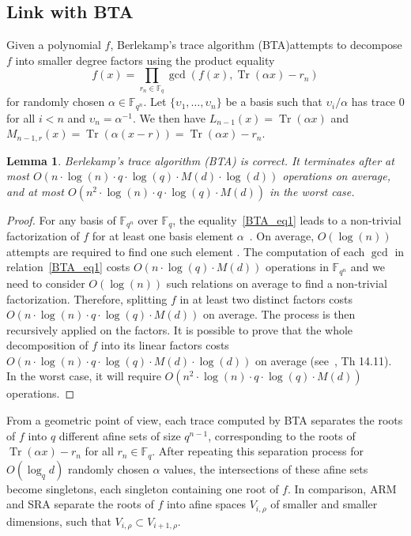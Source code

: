 \documentclass{sig-alternate}
\newcommand{\ff}[1]{\mathbb{F}_{#1}}
\newcommand{\fq}{\ff{q}}
\newcommand{\fqn}{\ff{q^n}}
\newcommand{\dd}{d}
\newcommand{\qq}{q}
\newcommand{\nn}{n}
\newcommand{\qn}{{\qq^\nn}}
\newcommand{\basef}{\ff{\qq}}
\newcommand{\extf}{\ff{\qn}}
\DeclareMathOperator{\Tr}{Tr}
\newcommand{\bigO}{O}
\newcounter{algo}
\newtheorem{Lem}{Lemma}
\begin{document}
\subsection{Link with BTA}

Given a polynomial $f$, Berlekamp's trace algorithm (BTA)attempts to decompose $f$ into smaller degree factors using the product equality
\begin{equation}\label{BTA_eq1}
f(x)=\prod_{r_n\in\fq}\gcd\left(f(x),\Tr(\alpha x)-r_n\right)
\end{equation}
for randomly chosen $\alpha\in\fqn$.
%
Let $\{\upsilon_1,\ldots,\upsilon_{\nn}\}$ be a basis such that $\upsilon_i/\alpha$ has trace 0 for all $i<\nn$ and $\upsilon_\nn=\alpha^{-1}$. We then have $L_{\nn-1}(x)=\Tr(\alpha x)$ and $M_{\nn-1,r}(x)=\Tr(\alpha (x-r))=\Tr(\alpha x)-r_\nn$.


 \begin{Lem}
 Berlekamp's trace algorithm (BTA) is correct. It terminates after at most $\bigO(n  \cdot \log(n) \cdot q \cdot \log(q) \cdot M(d) \cdot \log(d))$ operations on average, and at most $\bigO(n^2 \cdot \log(n) \cdot q \cdot \log(q) \cdot M(d) )$ in the worst case.
 \end{Lem}
\begin{proof}
For any basis of $\extf$ over $\basef$, the equality~\eqref{BTA_eq1} leads to a non-trivial factorization of $f$ for at least one basis element $\alpha$~\cite{berl70}.
% 
On average, $\bigO(\log(n))$ attempts are required to find one such element \cite{Menvanovans92}. The computation of each $\gcd$ in relation~\eqref{BTA_eq1} costs $\bigO(n \cdot \log(q) \cdot M(d))$ operations in $\extf$ and we need to consider $\bigO(\log(n))$ such relations on average to find a non-trivial factorization. Therefore, 
splitting $f$ in at least two distinct factors costs $\bigO(n \cdot \log(n) \cdot  q \cdot \log(q) \cdot M(d))$ on average. The process is then recursively applied on the factors. It is possible to prove that the whole decomposition of $f$ into its linear factors costs $\bigO(n  \cdot \log(n) \cdot q \cdot \log(q) \cdot M(d) \cdot \log(d))$ on average (see~\cite{Gathen2003}, Th 14.11). In the worst case, it will require $\bigO(n^2 \cdot \log(n) \cdot q \cdot \log(q) \cdot M(d) )$ operations.
\end{proof}

From a geometric point of view, each trace computed by BTA separates the roots of $f$ into $q$ different afine sets of size $\qq^{\nn-1}$, corresponding to the roots of $\Tr(\alpha x)-r_\nn$ for all $r_\nn\in\fq$. After repeating this separation process for $O(\log_\qq\dd)$  randomly chosen $\alpha$ values, the intersections of these afine sets become singletons, each singleton containing one root of $f$. 
%
In comparison, ARM and SRA separate the roots of $f$ into afine spaces $V_{i,\rho}$ of smaller and smaller dimensions, such that $V_{i,\rho}\subset V_{i+1,\rho}$. 
\end{document}
